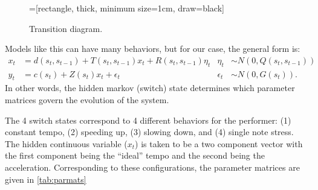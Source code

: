 \documentclass[11pt]{article}
\begin{document}
\begin{figure}[h!]
  \centering
  =[rectangle,
  thick, minimum size=1cm, draw=black]
  \caption{Transition diagram. \label{fig:transmat}}
\end{figure}


Models like this can have many behaviors, but for our case, the
general form is:
\begin{align}
  x_{t}&= d(s_{t},s_{t-1})+T(s_{t},s_{t-1}) x_t + R(s_{t},s_{t-1})\eta_{t} & \eta_t &\sim
                                                      N(0,Q(s_{t},s_{t-1}))\\
  y_t&= c(s_t) + Z(s_t) x_t + \epsilon_t & \epsilon_t &\sim N(0, G(s_t)).
\end{align}
In other words, the hidden markov (switch) state determines which parameter
matrices govern the evolution of the system. 

The 4 switch states correspond to 4 different behaviors for the
performer: (1) constant tempo, (2) speeding up, (3) slowing down, and
(4) single note stress. The hidden continuous variable ($x_t$) is
taken to be a two component vector with the first component being the
``ideal'' tempo and the second being the acceleration. 
Corresponding to these configurations, the parameter
matrices are given in \autoref{tab:parmats}
\end{document}

